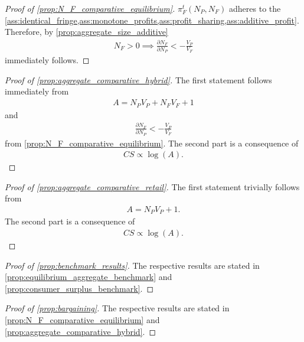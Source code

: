 \documentclass[a4paper]{article}
\begin{document}
\begin{proof}[Proof of \cref{prop:N_F_comparative_equilibrium}]
    $\pi^t_F(N_P ,N_F)$ adheres to the \cref{ass:identical_fringe,ass:monotone_profits,ass:profit_sharing,ass:additive_profit}.
    Therefore, by \cref{prop:aggregate_size_additive}
    \begin{align*}
        N_F > 0 \implies \frac{\partial N_F}{\partial N_P} < -\frac{V_P}{V_F}
    \end{align*}
    immediately follows.
\end{proof}

\begin{proof}[Proof of \cref{prop:aggregate_comparative_hybrid}]
    The first statement follows immediately from
    \begin{align*}
        A = N_P V_P + N_F V_F + 1
    \end{align*}
    and
    \begin{align*}
        \frac{\partial N_F}{\partial N_P} < -\frac{V_P}{V_F}
    \end{align*}
    from \cref{prop:N_F_comparative_equilibrium}.
    The second part is a consequence of
    \begin{align*}
        CS \propto \log(A).
    \end{align*}
\end{proof}

\begin{proof}[Proof of \cref{prop:aggregate_comparative_retail}]
    The first statement trivially follows from
    \begin{align*}
        A = N_P V_P + 1.
    \end{align*}
    The second part is a consequence of
    \begin{align*}
        CS \propto \log(A).
    \end{align*}
\end{proof}

\begin{proof}[Proof of \cref{prop:benchmark_results}]
    The respective results are stated in \cref{prop:equilibrium_aggregate_benchmark} and \cref{prop:consumer_surplus_benchmark}.
\end{proof}

\begin{proof}[Proof of \cref{prop:bargaining}]
    The respective results are stated in \cref{prop:N_F_comparative_equilibrium} and \cref{prop:aggregate_comparative_hybrid}.
\end{proof}
\end{document}

